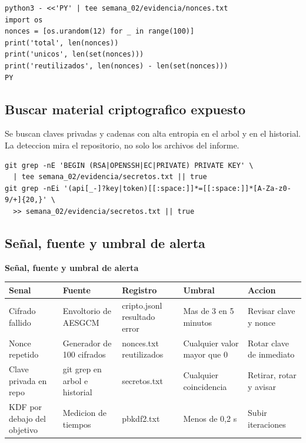 \documentclass[11pt,a4paper]{article}
\begin{document}
\begin{lstlisting}[style=estiloCodigo]
python3 - <<'PY' | tee semana_02/evidencia/nonces.txt
import os
nonces = [os.urandom(12) for _ in range(100)]
print('total', len(nonces))
print('unicos', len(set(nonces)))
print('reutilizados', len(nonces) - len(set(nonces)))
PY
\end{lstlisting}

\subsection{Buscar material criptografico expuesto}

Se buscan claves privadas y cadenas con alta entropia en el arbol y en el historial. La deteccion mira el repositorio, no solo los archivos del informe.

\begin{lstlisting}[style=estiloCodigo]
git grep -nE 'BEGIN (RSA|OPENSSH|EC|PRIVATE) PRIVATE KEY' \
  | tee semana_02/evidencia/secretos.txt || true
git grep -nEi '(api[_-]?key|token)[[:space:]]*=[[:space:]]*[A-Za-z0-9/+]{20,}' \
  >> semana_02/evidencia/secretos.txt || true
\end{lstlisting}

\subsection{Señal, fuente y umbral de alerta}

\begin{center}
\begin{minipage}{\linewidth}
\centering
{\footnotesize
\textbf{Señal, fuente y umbral de alerta}\par\smallskip
\begin{tabular}{@{}>{\raggedright\arraybackslash}p{2.40cm}>{\raggedright\arraybackslash}p{2.50cm}>{\raggedright\arraybackslash}p{3.20cm}>{\raggedright\arraybackslash}p{2.40cm}>{\raggedright\arraybackslash}p{3.40cm}@{}}
\toprule
\textbf{Senal} & \textbf{Fuente} & \textbf{Registro} & \textbf{Umbral} & \textbf{Accion} \\
\midrule
Cifrado fallido & Envoltorio de AESGCM & cripto.jsonl resultado error & Mas de 3 en 5 minutos & Revisar clave y nonce \\
Nonce repetido & Generador de 100 cifrados & nonces.txt reutilizados & Cualquier valor mayor que 0 & Rotar clave de inmediato \\
Clave privada en repo & git grep en arbol e historial & secretos.txt & Cualquier coincidencia & Retirar, rotar y avisar \\
KDF por debajo del objetivo & Medicion de tiempos & pbkdf2.txt & Menos de 0,2 s & Subir iteraciones \\
\bottomrule
\end{tabular}
}
\par{}
\end{minipage}
\end{center}
\end{document}

